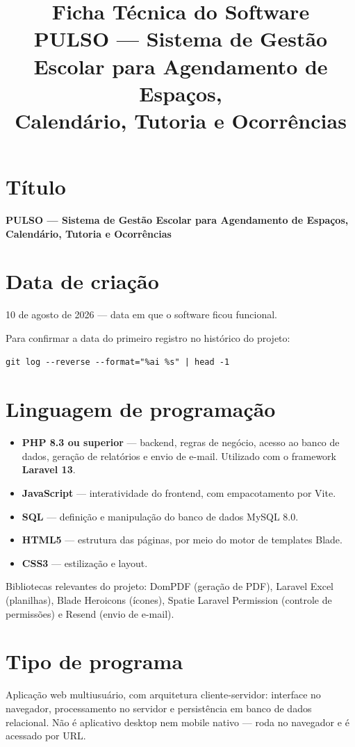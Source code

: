 \documentclass[12pt,a4paper]{article}
\title{\textbf{Ficha Técnica do Software}\\[0.3em]
\large PULSO --- Sistema de Gestão Escolar para Agendamento de Espaços,\\
Calendário, Tutoria e Ocorrências}
\author{}
\date{}
\begin{document}
\maketitle

\section{Título}
\textbf{PULSO --- Sistema de Gestão Escolar para Agendamento de Espaços, Calendário, Tutoria e Ocorrências}

\section{Data de criação}
10 de agosto de 2026 --- data em que o software ficou funcional.

Para confirmar a data do primeiro registro no histórico do projeto:
\begin{verbatim}
git log --reverse --format="%ai %s" | head -1
\end{verbatim}

\section{Linguagem de programação}
\begin{itemize}
  \item \textbf{PHP 8.3 ou superior} --- backend, regras de negócio, acesso ao banco de dados, geração de relatórios e envio de e-mail. Utilizado com o framework \textbf{Laravel 13}.
  \item \textbf{JavaScript} --- interatividade do frontend, com empacotamento por Vite.
  \item \textbf{SQL} --- definição e manipulação do banco de dados MySQL 8.0.
  \item \textbf{HTML5} --- estrutura das páginas, por meio do motor de templates Blade.
  \item \textbf{CSS3} --- estilização e layout.
\end{itemize}

Bibliotecas relevantes do projeto: DomPDF (geração de PDF), Laravel Excel (planilhas), Blade Heroicons (ícones), Spatie Laravel Permission (controle de permissões) e Resend (envio de e-mail).

\section{Tipo de programa}
Aplicação web multiusuário, com arquitetura cliente-servidor: interface no navegador, processamento no servidor e persistência em banco de dados relacional. Não é aplicativo desktop nem mobile nativo --- roda no navegador e é acessado por URL.
\end{document}
